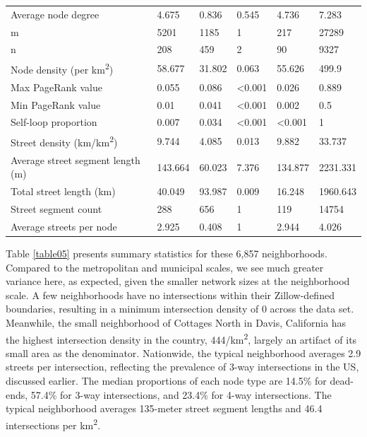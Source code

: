 \documentclass{article}
\begin{document}
\begin{table}
\begin{tabular}{llllll}
	Average node degree                         & 4.675   & 0.836   & 0.545          & 4.736          & 7.283    \\
	m                                           & 5201    & 1185    & 1              & 217            & 27289    \\
	n                                           & 208     & 459     & 2              & 90             & 9327     \\
	Node density (per km\textsuperscript{2})                      & 58.677  & 31.802  & 0.063          & 55.626         & 499.9    \\
	Max PageRank value                          & 0.055   & 0.086   & \textless0.001 & 0.026          & 0.889    \\
	Min PageRank value                          & 0.01    & 0.041   & \textless0.001 & 0.002          & 0.5      \\
	Self-loop proportion                        & 0.007   & 0.034   & \textless0.001 & \textless0.001 & 1        \\
	Street density (km/km\textsuperscript{2})                     & 9.744   & 4.085   & 0.013          & 9.882          & 33.737   \\
	Average street segment length (m)           & 143.664 & 60.023  & 7.376          & 134.877        & 2231.331 \\
	Total street length (km)                    & 40.049  & 93.987  & 0.009          & 16.248         & 1960.643 \\
	Street segment count                        & 288     & 656     & 1              & 119            & 14754    \\
	Average streets per node                    & 2.925   & 0.408   & 1              & 2.944          & 4.026    \\
	\bottomrule
\end{tabular}
\end{table}

Table \ref{table05} presents summary statistics for these 6,857 neighborhoods. Compared to the metropolitan and municipal scales, we see much greater variance here, as expected, given the smaller network sizes at the neighborhood scale. A few neighborhoods have no intersections within their Zillow-defined boundaries, resulting in a minimum intersection density of 0 across the data set. Meanwhile, the small neighborhood of Cottages North in Davis, California has the highest intersection density in the country, 444/km\textsuperscript{2}, largely an artifact of its small area as the denominator. Nationwide, the typical neighborhood averages 2.9 streets per intersection, reflecting the prevalence of 3-way intersections in the US, discussed earlier. The median proportions of each node type are 14.5\% for dead-ends, 57.4\% for 3-way intersections, and 23.4\% for 4-way intersections. The typical neighborhood averages 135-meter street segment lengths and 46.4 intersections per km\textsuperscript{2}.
\end{document}
